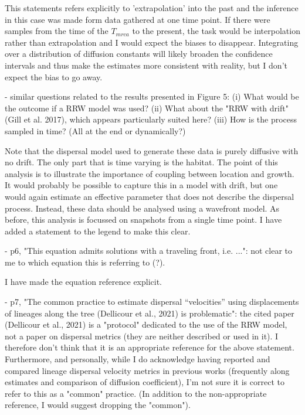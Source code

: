 \documentclass[11pt, oneside]{article}   	%
\newcommand{\response}[1]{{\color{black}{\bf Response:} #1}}
\begin{document}
\response{This statements refers explicitly to 'extrapolation' into the past and the inference in this case was made form data gathered at one time point. If there were samples from the time of the $T_{mrca}$ to the present, the task would be interpolation rather than extrapolation and I would expect the biases to disappear. Integrating over a distribution of diffusion constants will likely broaden the confidence intervals and thus make the estimates more consistent with reality, but I don't expect the bias to go away.}


- similar questions related to the results presented in Figure 5: (i) What would be the outcome if a RRW model was used? (ii) What about the "RRW with drift" (Gill et al. 2017), which appears particularly suited here? (iii) How is the process sampled in time? (All at the end or dynamically?)

\response{Note that the dispersal model used to generate these data is purely diffusive with no drift. The only part that is time varying is the habitat. The point of this analysis is to illustrate the importance of coupling between location and growth. It would probably be possible to capture this in a model with drift, but one would again estimate an effective parameter that does not describe the dispersal process. Instead, these data should be analysed using a wavefront model. As before, this analysis is focussed on snapshots from a single time point. I have added a statement to the legend to make this clear.}


- p6, "This equation admits solutions with a traveling front, i.e. ...": not clear to me to which equation this is referring to (?).

\response{I have made the equation reference explicit.}

- p7, "The common practice to estimate dispersal “velocities” using displacements of lineages along the tree (Dellicour et al., 2021) is problematic": the cited paper (Dellicour et al., 2021) is a "protocol" dedicated to the use of the RRW model, not a paper on dispersal metrics (they are neither described or used in it). I therefore don't think that it is an appropriate reference for the above statement. Furthermore, and personally, while I do acknowledge having reported and compared lineage dispersal velocity metrics in previous works (frequently along estimates and comparison of diffusion coefficient), I'm not sure it is correct to refer to this as a "common" practice. (In addition to the non-appropriate reference, I would suggest dropping the "common").
\end{document}
